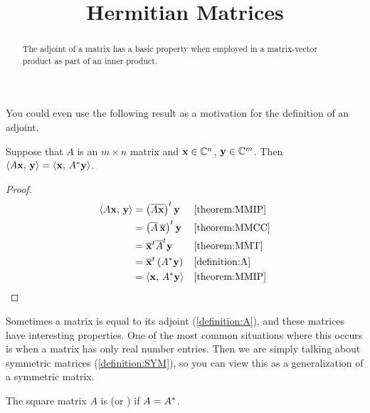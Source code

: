\documentclass{ximera}
\title{Hermitian Matrices}
\begin{document}
\begin{abstract}
  The adjoint of a matrix has a basic property when employed in a matrix-vector product as part of an inner product.
\end{abstract}
\maketitle

You could even use the following result as a motivation for the definition of an adjoint.

\begin{theorem}
  \label{theorem:AIP}

  Suppose that $A$ is an $m\times n$ matrix and
  $\mathbf{x}\in\mathbb{C}^{n}$, $\mathbf{y}\in\mathbb{C}^{m}$.  Then
  $\left\langle A\mathbf{x},\,\mathbf{y}\right\rangle=\left\langle\mathbf{x},\,A^\ast\mathbf{y}\right\rangle$.

  \begin{proof}
    
    \begin{align*}
      \left\langle A\mathbf{x},\,\mathbf{y}\right\rangle
      &=\left(\overline{A\mathbf{x}}\right)^{t}\mathbf{y}
      &&\ref{theorem:MMIP}\\
      &=\left(\overline{A}\,\overline{\mathbf{x}}\right)^{t}\mathbf{y}
      &&\ref{theorem:MMCC}\\
      &=\overline{\mathbf{x}}^{t}\overline{A}^{t}\mathbf{y}
      &&\ref{theorem:MMT}\\
      &=\overline{\mathbf{x}}^{t}\left(A^\ast\mathbf{y}\right)
      &&\ref{definition:A}\\
      &=\left\langle\mathbf{x},\,A^\ast\mathbf{y}\right\rangle
      &&\ref{theorem:MMIP}
    \end{align*}
  \end{proof}
\end{theorem}

Sometimes a matrix is equal to its adjoint (\ref{definition:A}), and
these matrices have interesting properties.  One of the most common
situations where this occurs is when a matrix has only real number
entries.  Then we are simply talking about symmetric matrices
(\ref{definition:SYM}), so you can view this as a generalization of a
symmetric matrix.

\begin{definition}
  The square matrix $A$ is  (or ) if $A=A^\ast$.
\end{definition}
\end{document}
